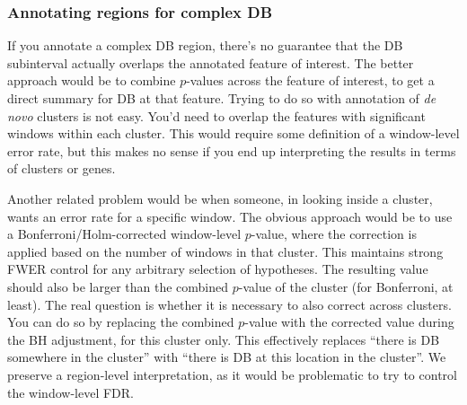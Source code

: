 \documentclass[12pt]{report}
\begin{document}
\subsubsection*{Annotating regions for complex DB}

If you annotate a complex DB region, there's no guarantee that the DB subinterval actually overlaps the annotated feature of interest.
The better approach would be to combine $p$-values across the feature of interest, to get a direct summary for DB at that feature.
Trying to do so with annotation of \textit{de novo} clusters is not easy.
You'd need to overlap the features with significant windows within each cluster.
This would require some definition of a window-level error rate, but this makes no sense if you end up interpreting the results in terms of clusters or genes. 

Another related problem would be when someone, in looking inside a cluster, wants an error rate for a specific window.
The obvious approach would be to use a Bonferroni/Holm-corrected window-level $p$-value, where the correction is applied based on the number of windows in that cluster.
This maintains strong FWER control for any arbitrary selection of hypotheses.
The resulting value should also  be larger than the combined $p$-value of the cluster (for Bonferroni, at least).
The real question is whether it is necessary to also correct across clusters.
You can do so by replacing the combined $p$-value with the corrected value during the BH adjustment, for this cluster only.
This effectively replaces ``there is DB somewhere in the cluster'' with ``there is DB at this location in the cluster''.
We preserve a region-level interpretation, as it would be problematic to try to control the window-level FDR.
\end{document}
